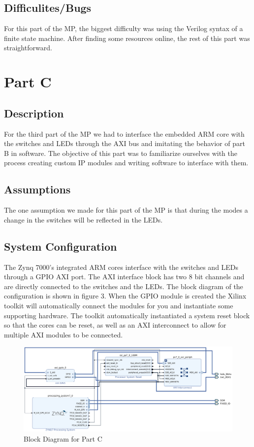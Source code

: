 \documentclass[letterpaper, 10 pt, conference]{IEEEconf}  %
\begin{document}
\subsection{Difficulites/Bugs}
For this part of the MP, the biggest difficulty was using the Verilog syntax of a finite state machine. After finding some resources online, the rest of this part was straightforward. 






\section{Part C}
\subsection{Description}
For the third part of the MP we had to interface the embedded ARM core with the switches and LEDs through the AXI bus and imitating the behavior of part B in software. The objective of this part was to familiarize ourselves with the process creating custom IP modules and writing software to interface with them.

\subsection{Assumptions}
The one assumption we made for this part of the MP is that during the modes a change in the switches will be reflected in the LEDs.

\subsection{System Configuration}
The Zynq 7000's integrated ARM cores interface with the switches and LEDs through a GPIO AXI port. The AXI interface block has two 8 bit channels and are directly connected to the switches and the LEDs. The block diagram of the configuration is shown in figure 3. When the GPIO module is created the Xilinx toolkit will automatically connect the modules for you and instantiate some supporting hardware. The toolkit automatically instantiated a system reset block so that the cores can be reset, as well as an AXI interconnect to allow for multiple AXI modules to be connected.

\begin{figure}[thpb]
   \centering
   \parbox{3in}{\centering\includegraphics[scale=0.4]{img/mp1c_diagram.PNG}}
   \caption{Block Diagram for Part C}
   \label{figurelabel}
\end{figure}
\end{document}
